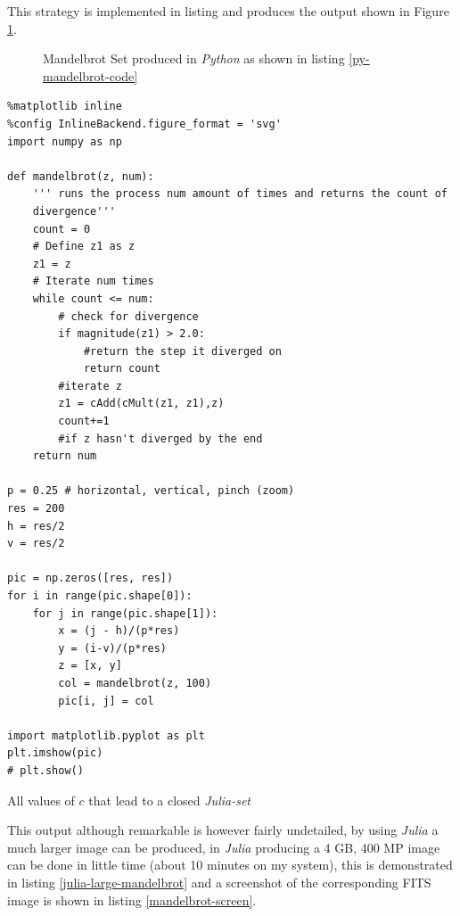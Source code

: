 \documentclass[a4paper,11pt,twoside]{article}
\begin{document}
This strategy is implemented in listing and produces the output shown in Figure \ref{mandelbrot-py-pic}.


\begin{figure}[htbp]
\centering

\caption{\label{mandelbrot-py-pic}Mandelbrot Set produced in \emph{Python} as shown in listing \ref{py-mandelbrot-code}}
\end{figure}

\begin{listing}[htbp]
\begin{verbatim}
%matplotlib inline
%config InlineBackend.figure_format = 'svg'
import numpy as np

def mandelbrot(z, num):
    ''' runs the process num amount of times and returns the count of
    divergence'''
    count = 0
    # Define z1 as z
    z1 = z
    # Iterate num times
    while count <= num:
        # check for divergence
        if magnitude(z1) > 2.0:
            #return the step it diverged on
            return count
        #iterate z
        z1 = cAdd(cMult(z1, z1),z)
        count+=1
        #if z hasn't diverged by the end
    return num

p = 0.25 # horizontal, vertical, pinch (zoom)
res = 200
h = res/2
v = res/2

pic = np.zeros([res, res])
for i in range(pic.shape[0]):
    for j in range(pic.shape[1]):
        x = (j - h)/(p*res)
        y = (i-v)/(p*res)
        z = [x, y]
        col = mandelbrot(z, 100)
        pic[i, j] = col

import matplotlib.pyplot as plt
plt.imshow(pic)
# plt.show()
\end{verbatim}
\caption{\label{py-mandelbrot-code}All values of \(c\) that lead to a closed \emph{Julia-set}}
\end{listing}


This output although remarkable is however fairly undetailed, by using \emph{Julia} a much
larger image can be produced, in \emph{Julia} producing a 4 GB, 400 MP image can be done in little time
(about 10 minutes on my system), this is demonstrated in listing \ref{julia-large-mandelbrot}
and a screenshot of the corresponding FITS image is shown in listing \ref{mandelbrot-screen}.
\end{document}
